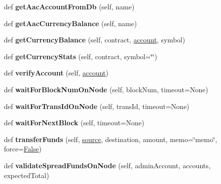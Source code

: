 \begin{DoxyCompactItemize}
def {\bfseries get\+Aac\+Account\+From\+Db} (self, name)
\item 
\mbox{\label{classtest_utils_1_1_node_a163f0a776198d8acd709e88797cb489a}} 
def {\bfseries get\+Aac\+Currency\+Balance} (self, name)
\item 
\mbox{\label{classtest_utils_1_1_node_a8cd6e229ef4bf40462cfb8d68171c8ad}} 
def {\bfseries get\+Currency\+Balance} (self, contract, \mbox{\hyperlink{structaccount}{account}}, symbol)
\item 
\mbox{\label{classtest_utils_1_1_node_a5c5bb5fe0be01c34fce113197931f610}} 
def {\bfseries get\+Currency\+Stats} (self, contract, symbol=\char`\"{}\char`\"{})
\item 
\mbox{\label{classtest_utils_1_1_node_a9b9485e833f868a5d105538821b993a5}} 
def {\bfseries verify\+Account} (self, \mbox{\hyperlink{structaccount}{account}})
\item 
\mbox{\label{classtest_utils_1_1_node_a5910f21f7705a31c2767652b5fb6354c}} 
def {\bfseries wait\+For\+Block\+Num\+On\+Node} (self, block\+Num, timeout=None)
\item 
\mbox{\label{classtest_utils_1_1_node_aeab6a6eaf2a5b021699630f08188e778}} 
def {\bfseries wait\+For\+Trans\+Id\+On\+Node} (self, trans\+Id, timeout=None)
\item 
\mbox{\label{classtest_utils_1_1_node_abbddca09f4749a3ce2c757ca5083aecc}} 
def {\bfseries wait\+For\+Next\+Block} (self, timeout=None)
\item 
\mbox{\label{classtest_utils_1_1_node_a2e760a66a5356494b1a4028b2880eb74}} 
def {\bfseries transfer\+Funds} (self, \mbox{\hyperlink{structsource}{source}}, destination, amount, memo=\char`\"{}memo\char`\"{}, force=\mbox{\hyperlink{struct_false}{False}})
\item 
\mbox{\label{classtest_utils_1_1_node_ac812a9188e16c5c5571164fe26f1bc55}} 
def {\bfseries validate\+Spread\+Funds\+On\+Node} (self, admin\+Account, accounts, expected\+Total)

\end{DoxyCompactItemize}
